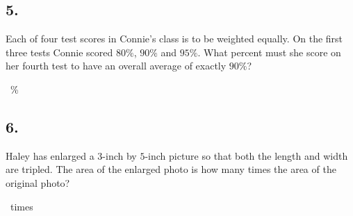 \documentclass[12pt]{article}
\newenvironment{answer}{\vspace{1em}}{}
\newenvironment{answer}{\vspace{0em}\expandafter\comment}{\expandafter\endcomment}
\newlength{\currentparskip}
\newlength{\currentparindent}
\newenvironment{minipagex}[2][]
  {\setlength{\currentparskip}{\parskip}%
    \setlength{\currentparindent}{\parindent}%
   \begin{minipage}[#1]{#2}%
   \setlength{\parskip}{\currentparskip}%
   \setlength{\parindent}{\currentparindent}%
  }
  {\end{minipage}}
\begin{document}
\subsection*{5.}
Each of four test scores in Connie's class is to be weighted equally. On the first three tests Connie scored $80\%$, $90\%$ and $95\%$. What percent must she score on her fourth test to have an overall average of exactly $90\%$?

\fbox{\phantom{ANSWER}}~\%

\begin{answer}
%
\end{answer}


\subsection*{6.}
Haley has enlarged a $3$-inch by $5$-inch picture so that both the length and width are tripled. The area of the enlarged photo is how many times the area of the original photo? 

\fbox{\phantom{ANSWER}}~times
\end{document}
